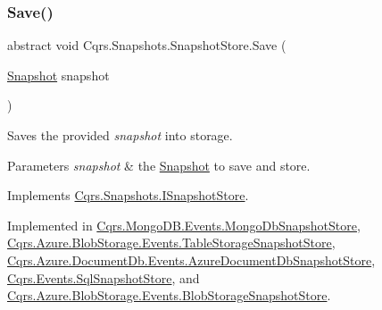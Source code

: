 \mbox{\label{classCqrs_1_1Snapshots_1_1SnapshotStore_ae96ea2bb89a0bd7f45544acc37107525_ae96ea2bb89a0bd7f45544acc37107525}} 
\subsubsection{\texorpdfstring{Save()}{Save()}}
{\footnotesize\ttfamily abstract void Cqrs.\+Snapshots.\+Snapshot\+Store.\+Save (\begin{DoxyParamCaption}\item[{\hyperlink{classCqrs_1_1Snapshots_1_1Snapshot}{Snapshot}}]{snapshot }\end{DoxyParamCaption})\hspace{0.3cm}{\ttfamily [pure virtual]}}



Saves the provided {\itshape snapshot}  into storage. 


\begin{DoxyParams}{Parameters}
{\em snapshot} & the \hyperlink{classCqrs_1_1Snapshots_1_1Snapshot}{Snapshot} to save and store.\\
\hline
\end{DoxyParams}


Implements \hyperlink{interfaceCqrs_1_1Snapshots_1_1ISnapshotStore_a6e99c620115ce8a0648a83bf2ce05527_a6e99c620115ce8a0648a83bf2ce05527}{Cqrs.\+Snapshots.\+I\+Snapshot\+Store}.



Implemented in \hyperlink{classCqrs_1_1MongoDB_1_1Events_1_1MongoDbSnapshotStore_abd129099f8ed40c140ad2b39e730035a_abd129099f8ed40c140ad2b39e730035a}{Cqrs.\+Mongo\+D\+B.\+Events.\+Mongo\+Db\+Snapshot\+Store}, \hyperlink{classCqrs_1_1Azure_1_1BlobStorage_1_1Events_1_1TableStorageSnapshotStore_a25ec7d179773aec79febdf0e8873b285_a25ec7d179773aec79febdf0e8873b285}{Cqrs.\+Azure.\+Blob\+Storage.\+Events.\+Table\+Storage\+Snapshot\+Store}, \hyperlink{classCqrs_1_1Azure_1_1DocumentDb_1_1Events_1_1AzureDocumentDbSnapshotStore_a52dd38e57e884db7529c8f57c3da7479_a52dd38e57e884db7529c8f57c3da7479}{Cqrs.\+Azure.\+Document\+Db.\+Events.\+Azure\+Document\+Db\+Snapshot\+Store}, \hyperlink{classCqrs_1_1Events_1_1SqlSnapshotStore_ae219c88f6d56fbceef7c738dae824666_ae219c88f6d56fbceef7c738dae824666}{Cqrs.\+Events.\+Sql\+Snapshot\+Store}, and \hyperlink{classCqrs_1_1Azure_1_1BlobStorage_1_1Events_1_1BlobStorageSnapshotStore_afb32196428d4c92c9542a94a1764fa59_afb32196428d4c92c9542a94a1764fa59}{Cqrs.\+Azure.\+Blob\+Storage.\+Events.\+Blob\+Storage\+Snapshot\+Store}.



